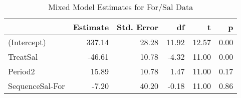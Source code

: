 \begin{table}

\caption{\label{tab:pefrDataEstimates}Mixed Model Estimates for For/Sal Data}
\centering
\begin{tabular}[t]{>{}l|rrrrr}
\toprule
 & Estimate & Std. Error & df & t & p\\
\midrule
(Intercept) & 337.14 & 28.28 & 11.92 & 12.57 & 0.00\\
TreatSal & -46.61 & 10.78 & -4.32 & 11.00 & 0.00\\
Period2 & 15.89 & 10.78 & 1.47 & 11.00 & 0.17\\
SequenceSal-For & -7.20 & 40.20 & -0.18 & 11.00 & 0.86\\
\bottomrule
\end{tabular}
\end{table}
